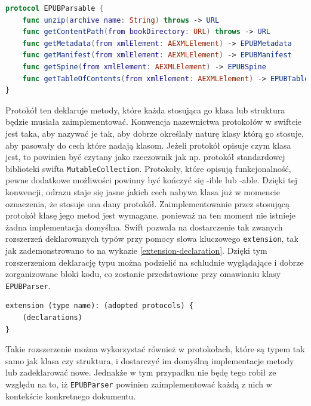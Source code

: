 \begin{lstlisting}[caption={Protokół EPUBParsable}, language=swift,label=EPUBParsable-declaration]
protocol EPUBParsable {
    func unzip(archive name: String) throws -> URL
    func getContentPath(from bookDirectory: URL) throws -> URL
    func getMetadata(from xmlElement: AEXMLElement) -> EPUBMetadata
    func getManifest(from xmlElement: AEXMLElement) -> EPUBManifest
    func getSpine(from xmlElement: AEXMLElement) -> EPUBSpine
    func getTableOfContents(from xmlElement: AEXMLElement) -> EPUBTableOfContents
}
\end{lstlisting}

Protokół ten deklaruje metody, które każda stosująca go klasa lub struktura będzie musiała zaimplementować. Konwencja nazewnictwa protokołów w swiftcie jest taka, aby nazywać je tak, aby dobrze określały naturę klasy którą go stosuje, aby pasowały do cech które nadają klasom. Jeżeli protokół opisuje czym klasa jest, to powinien być czytany jako rzeczownik jak np. protokół standardowej biblioteki swifta \texttt{MutableCollection}. Protokoły, które opisują funkcjonalność, pewne dodatkowe możliwości powinny być kończyć się -ible lub -able. Dzięki tej konwencji, odrazu staje się jasne jakich cech nabywa klasa już w momencie oznaczenia, że stosuje ona dany protokół. Zaimplementowanie przez stosującą protokół klasę jego metod jest wymagane, ponieważ na ten moment nie istnieje żadna implementacja domyślna. Swift pozwala na dostarczenie tak zwanych rozszerzeń deklarowanych typów przy pomocy słowa kluczowego \texttt{extension}, tak jak zademonstrowano to na wykazie \ref{extension-declaration}. Dzięki tym rozszerzeniom deklarację typu można podzielić na schludnie wyglądające i dobrze zorganizowane bloki kodu, co zostanie przedstawione przy omawianiu klasy \texttt{EPUBParser}.

\begin{lstlisting}[caption={Deklaracja wyrażenia \texttt{extension}\cite{theSwiftProgrammingLanguageDeclarations}},language=swift-reference,label=extension-declaration]
extension (type name): (adopted protocols) {
    (declarations)
}
\end{lstlisting}

Takie rozszerzenie można wykorzystać również w protokołach, które są typem tak samo jak klasa czy struktura, i dostarczyć im domyślną implementacje metody lub zadeklarować nowe. Jednakże w tym przypadku nie będę tego robił ze względu na to, iż \texttt{EPUBParser} powinien zaimplementować każdą z nich w kontekście konkretnego dokumentu.

